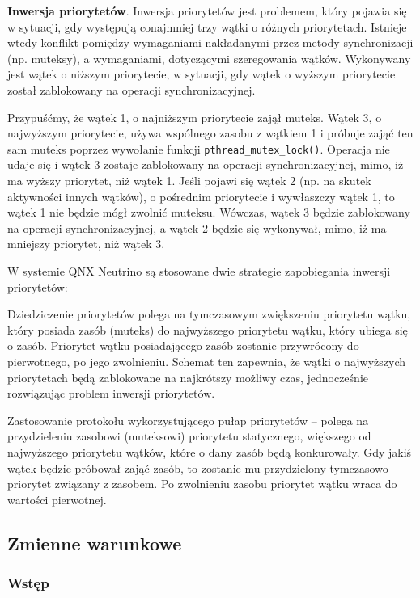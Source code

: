 \textbf{Inwersja priorytetów}. Inwersja priorytetów jest problemem, który pojawia się w sytuacji, gdy występują conajmniej trzy wątki o różnych priorytetach. Istnieje wtedy konflikt pomiędzy wymaganiami nakładanymi przez metody synchronizacji (np. muteksy), a wymaganiami, dotyczącymi szeregowania wątków. Wykonywany jest wątek o niższym priorytecie, w sytuacji, gdy wątek o wyższym priorytecie został zablokowany na operacji synchronizacyjnej.

Przypuśćmy, że wątek 1, o najniższym priorytecie zajął muteks. Wątek 3, o najwyższym priorytecie, używa wspólnego zasobu z wątkiem 1 i próbuje zająć ten sam muteks poprzez wywołanie funkcji \lstinline[style=MyCStyle]{pthread_mutex_lock()}. Operacja nie udaje się i wątek 3 zostaje zablokowany na operacji synchronizacyjnej, mimo, iż ma wyższy priorytet, niż wątek 1. Jeśli pojawi się wątek 2 (np. na skutek aktywności innych wątków), o pośrednim priorytecie i wywłaszczy wątek 1, to wątek 1 nie będzie mógł zwolnić muteksu. Wówczas, wątek 3 będzie zablokowany na operacji synchronizacyjnej, a wątek 2 będzie się wykonywał, mimo, iż ma mniejszy priorytet, niż wątek 3.

W systemie QNX Neutrino są stosowane dwie strategie zapobiegania inwersji priorytetów:
\begin{myenumerate}
\item Dziedziczenie priorytetów polega na tymczasowym zwiększeniu priorytetu wątku, który posiada zasób (muteks) do najwyższego priorytetu wątku, który ubiega się o zasób. Priorytet wątku posiadającego zasób zostanie przywrócony do pierwotnego, po jego zwolnieniu. Schemat ten zapewnia, że wątki o najwyższych priorytetach będą zablokowane na najkrótszy możliwy czas, jednocześnie rozwiązując problem inwersji priorytetów.
\item Zastosowanie protokołu wykorzystującego pułap priorytetów -- polega na przydzieleniu zasobowi (muteksowi) priorytetu statycznego, większego od najwyższego priorytetu wątków, które o dany zasób będą konkurowały. Gdy jakiś wątek będzie próbował zająć zasób, to zostanie mu przydzielony tymczasowo priorytet związany z zasobem. Po zwolnieniu zasobu priorytet wątku wraca do wartości pierwotnej.
\end{myenumerate}

\subsection{Zmienne warunkowe}

\subsubsection{Wstęp}

